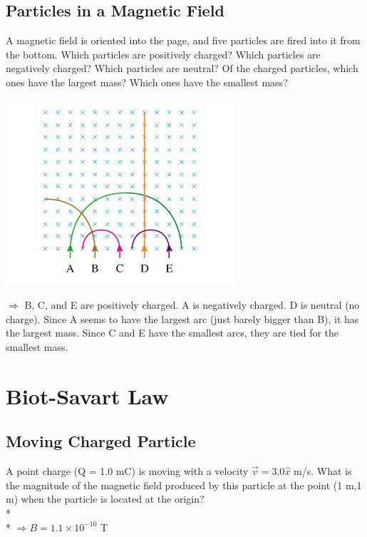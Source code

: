 \documentclass[11pt]{article}
\begin{document}
\subsection{Particles in a Magnetic Field}
A magnetic field is oriented into the page, and five particles are fired into it from the bottom.  Which particles are positively charged?  Which particles are negatively charged?  Which particles are neutral?  Of the charged particles, which ones have the largest mass?  Which ones have the smallest mass?

\begin{center}
\includegraphics[scale=0.75]{Images/particles_in_magnetic_field.png}
\end{center}

$\Rightarrow$ B, C, and E are positively charged.  A is negatively charged.  D is neutral (no charge).  Since A seems to have the largest arc (just barely bigger than B), it has the largest mass.  Since C and E have the smallest arcs, they are tied for the smallest mass.



\pagebreak
\section{Biot-Savart Law}
\vspace{10pt}

\subsection{Moving Charged Particle}
A point charge (Q = 1.0 mC) is moving with a velocity $\vec{v} = 3.0 \hat{x}$ m/s.  What is the magnitude of the magnetic field produced by this particle at the point (1 m,1 m) when the particle is located at the origin? \\* \\*
$\Rightarrow B = 1.1 \times 10^{-10}$ T
\end{document}

